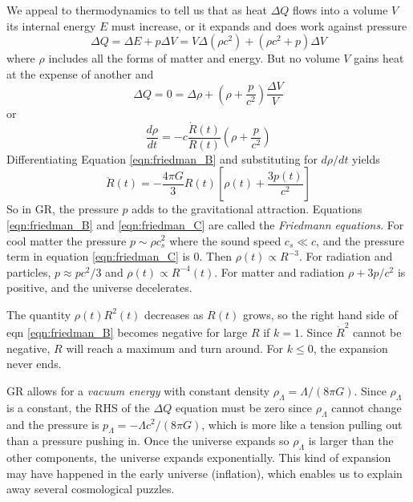 \documentclass[]{article}
\begin{document}
We appeal to thermodynamics to tell us that
as heat $\Delta Q$ flows into a volume $V$ its
internal energy $E$ must increase, or it expands
and does work against pressure
\begin{equation}
\Delta Q = \Delta E + p \Delta V = V \Delta(\rho c^2) + (\rho c^2 + p)\Delta V
\end{equation}
\noindent
where $\rho$ includes all the forms of matter and energy.
But no volume $V$ gains heat at the expense of another and
\begin{equation}
\Delta Q = 0 = \Delta \rho + \left(\rho + \frac{p}{c^2}\right)\frac{\Delta V}{V}
\end{equation}
\noindent
or
\begin{equation}
\frac{d\rho}{dt} = - c \frac{\dot{R}(t)}{R(t)}\left( \rho + \frac{p}{c^2}\right)
\end{equation}
\noindent
Differentiating Equation \ref{eqn:friedman_B} and substituting for $d\rho/dt$
yields
\begin{equation}
\label{eqn:friedman_C}
\ddot{R}(t) = - \frac{4\pi G}{3} R(t) \left[ \rho(t) + \frac{3p(t)}{c^2}\right]
\end{equation}
\noindent
So in GR, the pressure $p$ adds to the gravitational attraction. 
Equations \ref{eqn:friedman_B} and \ref{eqn:friedman_C} are
called the {\it Friedmann equations}.  For cool matter
the pressure $p \sim \rho c_s^2$ where the sound speed $c_s \ll c$,
and the pressure term in equation \ref{eqn:friedman_C} is 0.
Then $\rho(t)\propto R^{-3}$.  For radiation and particles,
$p\approx pc^2/3$ and $\rho(t) \propto R^{-4}(t)$.
For matter and radiation $\rho + 3p/c^2$ is positive, and the
universe decelerates. 

The quantity $\rho(t)R^2(t)$ decreases as $R(t)$ grows, so the
right hand side of eqn \ref{eqn:friedman_B} becomes negative
for large $R$ if $k=1$.  Since $\dot{R}^2$ cannot be negative,
$R$ will reach a maximum and turn around.  For $k\le0$, the
expansion never ends.

GR allows for a {\it vacuum energy} with constant density $\rho_{\Lambda} = \Lambda/(8\pi G)$.  Since $\rho_{\Lambda}$ is a constant, the RHS of the $\Delta Q$ equation must
be zero since $\rho_{\Lambda}$
cannot change and the pressure is $p_{\Lambda} = -\Lambda c^2/(8\pi G)$,
which is more like a tension pulling out than a pressure pushing in.
Once the universe expands so $\rho_{\Lambda}$ is larger than the other
components, the universe expands exponentially.  This kind of 
expansion may have happened in the early universe (inflation), which
enables us to explain away several cosmological puzzles.
\end{document}
